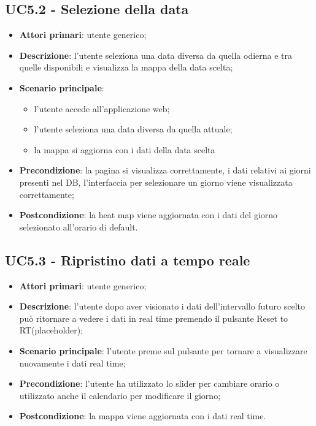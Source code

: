 \subsection{UC5.2 - Selezione della data}
\begin{itemize}
	\item \textbf{Attori primari}: utente generico;
	\item \textbf{Descrizione}:  l’utente seleziona una data diversa da quella odierna e tra quelle disponibili e visualizza la mappa della data scelta;
	\item \textbf{Scenario principale}:
		\begin{itemize}
			\item l’utente accede all’applicazione web;
			\item l’utente seleziona una data diversa da quella attuale;
			\item la mappa si aggiorna con i dati della data scelta
		\end{itemize}
	\item \textbf{Precondizione}: la pagina si visualizza correttamente, i dati relativi ai giorni presenti nel DB, l’interfaccia per selezionare un giorno viene visualizzata correttamente;
	\item \textbf{Postcondizione}:  la heat map viene aggiornata con i dati del giorno selezionato all’orario di default.
\end{itemize}

\subsection{UC5.3 - Ripristino dati a tempo reale}
\begin{itemize}
	\item \textbf{Attori primari}: utente generico;
	\item \textbf{Descrizione}:  l’utente dopo aver visionato i dati dell'intervallo futuro scelto può ritornare a vedere i dati in real time premendo il pulsante Reset to RT(placeholder);
	\item \textbf{Scenario principale}: l’utente preme sul pulsante per tornare a visualizzare nuovamente i dati real time;
	\item \textbf{Precondizione}:  l’utente ha utilizzato lo slider per cambiare orario o utilizzato anche il calendario per modificare il giorno;
	\item \textbf{Postcondizione}: la mappa viene aggiornata con i dati real time.
\end{itemize}

